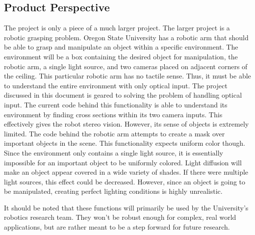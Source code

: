 \documentclass[10pt,journal,compsoc, draftclsnofoot,onecolumn]{IEEEtran}
\begin{document}
\subsection{Product Perspective}

The project is only a piece of a much larger project.
The larger project is a robotic grasping problem.
Oregon State University has a robotic arm that should be able to grasp and manipulate an object within a specific environment.
The environment will be a box containing the desired object for manipulation, the robotic arm, a single light source, and two cameras placed on adjacent corners of the ceiling.
This particular robotic arm has no tactile sense.
Thus, it must be able to understand the entire environment with only optical input.
The project discussed in this document is geared to solving the problem of handling optical input.
The current code behind this functionality is able to understand its environment by finding cross sections within its two camera inputs.
This effectively gives the robot stereo vision.
However, its sense of objects is extremely limited.
The code behind the robotic arm attempts to create a mask over important objects in the scene.
This functionality expects uniform color though.
Since the environment only contains a single light source, it is essentially impossible for an important object to be uniformly colored.
Light diffusion will make an object appear covered in a wide variety of shades.
If there were multiple light sources, this effect could be decreased.
However, since an object is going to be manipulated, creating perfect lighting conditions is highly unrealistic.

\noindent
It should be noted that these functions will primarily be used by the University's robotics research team.
They won't be robust enough for complex, real world applications, but are rather meant to be a step forward for future research.
\end{document}
